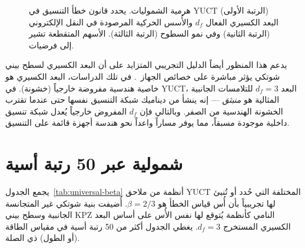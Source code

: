 \documentclass[11pt,a4paper]{article}
\begin{document}
	\begin{figure}[htbp]
		\begin{otherlanguage}{english}
			\centering
		\end{otherlanguage}
		\caption{هرمية الشموليات. يحدد قانون خطأ التنسيق في YUCT (الرتبة الأولى) البعد الكسيري الفعال \(d_f\) والأُسس الحركية المرصودة في النقل الإلكتروني (الرتبة الثانية) وفي نمو السطوح (الرتبة الثالثة). الأسهم المتقطعة تشير إلى فرضيات.}
		\label{fig:hierarchy}
	\end{figure}
	
	يدعم هذا المنظور أيضاً الدليل التجريبي المتزايد على أن البعد الكسيري لسطح بيني شوتكي يؤثر مباشرة على خصائص الجهاز~\cite{FractalSchottky}. في تلك الدراسات، البعد الكسيري هو خاصية هندسية مفروضة خارجياً (خشونة). في YUCT، البعد \(d_f = 3\) للتلامسات الجانبية المثالية هو \emph{منبثق} — إنه ينشأ من ديناميك شبكة التنسيق نفسها حتى عندما تقترب الخشونة الهندسية من الصفر. وبالتالي فإن \(d_f\) المفروض خارجياً يُعدل شبكة تنسيق داخلية موجودة مسبقاً، مما يوفر مساراً واعداً نحو هندسة أجهزة قائمة على التنسيق.
	
	\section{شمولية عبر 50 رتبة أسية}
	يجمع الجدول~\ref{tab:universal-beta} أنظمة من ملاحق YUCT المختلفة التي حُدد أو تُنبئ لها تجريبياً بأن أُس قياس الخطأ هو \(\beta = 2/3\). أُضيفت بنية شوتكي غير المتجانسة الجانبية وسطح بيني KPZ النامي كأنظمة يُتوقع لها نفس الأُس على أساس البعد الكسيري المستخرج \(d_f = 3\). يغطي الجدول أكثر من 50 رتبة أسية في مقياس الطاقة (أو الطول) ذي الصلة.
	
\end{document}
